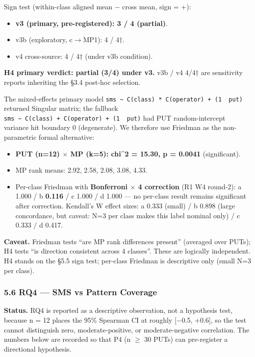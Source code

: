 \documentclass[review,12pt,authoryear]{elsarticle}
\providecommand{\tightlist}{\setlength{\itemsep}{0pt}\setlength{\parskip}{0pt}}
\begin{document}
Sign test (within-class aligned mean − cross mean, sign = +):

\begin{itemize}
\tightlist
\item
  \textbf{v3 (primary, pre-registered): 3 / 4 (partial)}.
\item
  v3b (exploratory, c$\to$MP1): 4 / 4†.
\item
  v4 cross-source: 4 / 4† (under v3b condition).
\end{itemize}

\textbf{H4 primary verdict: partial (3/4) under v3.} v3b / v4 4/4† are
sensitivity reports inheriting the §3.4 post-hoc selection.

The mixed-effects primary model
\texttt{sms\ \textasciitilde{}\ C(class)\ *\ C(operator)\ +\ (1\ \textbar{}\ put)}
returned Singular matrix; the fallback
\texttt{sms\ \textasciitilde{}\ C(class)\ +\ C(operator)\ +\ (1\ \textbar{}\ put)}
had PUT random-intercept variance hit boundary 0 (degenerate). We
therefore use Friedman as the non-parametric formal alternative:

\begin{itemize}
\tightlist
\item
  \textbf{PUT (n=12) $\times$ MP (k=5): chi\^{}2 = 15.30, p = 0.0041}
  (significant).
\item
  MP rank means: 2.92, 2.58, 2.08, 3.08, 4.33.
\item
  Per-class Friedman with \textbf{Bonferroni $\times$ 4 correction} (R1 W4
  round-2): a 1.000 / b \textbf{0.116} / c 1.000 / d 1.000 --- no
  per-class result remains significant after correction. Kendall's W
  effect sizes: a 0.333 (small) / b 0.898 (large concordance, but
  caveat: N=3 per class makes this label nominal only) / c 0.333 / d
  0.417.
\end{itemize}

\textbf{Caveat.} Friedman tests ``are MP rank differences present''
(averaged over PUTs); H4 tests ``is direction consistent across 4
classes''. These are logically independent. H4 stands on the §5.5 sign
test; per-class Friedman is descriptive only (small N=3 per class).

\subsubsection{5.6 RQ4 --- SMS vs Pattern
Coverage}\label{rq4-sms-vs-pattern-coverage}

\textbf{Status.} RQ4 is reported as a descriptive observation, not a
hypothesis test, because n = 12 places the 95\% Spearman CI at roughly
{[}−0.5, +0.6{]}, so the test cannot distinguish zero,
moderate-positive, or moderate-negative correlation. The numbers below
are recorded so that P4 (n $\geq$ 30 PUTs) can pre-register a directional
hypothesis.
\end{document}
